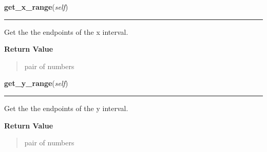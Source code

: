 \hspace{.8\funcindent}\begin{boxedminipage}{\funcwidth}

    \raggedright \textbf{get\_x\_range}(\textit{self})

    \vspace{-1.5ex}

    \rule{\textwidth}{0.5\fboxrule}
\setlength{\parskip}{2ex}
    Get the the endpoints of the x interval.

\setlength{\parskip}{1ex}
      \textbf{Return Value}
    \vspace{-1ex}

      \begin{quote}
      pair of numbers

      \end{quote}

    \end{boxedminipage}

    \label{pygtk_chart:line_chart:Graph:get_y_range}

    \vspace{0.5ex}

\hspace{.8\funcindent}\begin{boxedminipage}{\funcwidth}

    \raggedright \textbf{get\_y\_range}(\textit{self})

    \vspace{-1.5ex}

    \rule{\textwidth}{0.5\fboxrule}
\setlength{\parskip}{2ex}
    Get the the endpoints of the y interval.

\setlength{\parskip}{1ex}
      \textbf{Return Value}
    \vspace{-1ex}

      \begin{quote}
      pair of numbers

      \end{quote}

    \end{boxedminipage}

    \label{pygtk_chart:line_chart:Graph:get_name}

